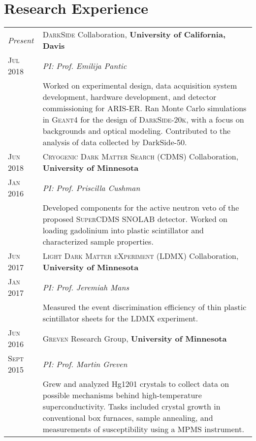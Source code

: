 \documentclass[a4paper,10pt]{article}
\newcommand{\UCD}{\textbf{University of California, Davis\xspace}}
\newcommand{\UMN}{\textbf{University of Minnesota\xspace}}
\begin{document}
\section{Research Experience}
\begin{tabular}{R{1.5cm}|L{14cm}}
\emph{Present}  & \textsc{DarkSide} Collaboration, \UCD \\
\textsc{Jul 2018} & \textit{PI: Prof. Emilija Pantic} \\
& {\footnotesize Worked on experimental design, data acquisition system development, hardware development, and detector commissioning for ARIS-ER. Ran Monte Carlo simulations in \textsc{Geant4} for the design of \textsc{DarkSide-20k}, with a focus on backgrounds and optical modeling. Contributed to the analysis of data collected by DarkSide-50.} \\

\hline \hline \hline {}

\textsc{Jun 2018} & \textsc{Cryogenic Dark Matter Search (CDMS)} Collaboration, \UMN \\
\textsc{Jan 2016} & \textit{PI: Prof. Priscilla Cushman} \\
& {\footnotesize Developed components for the active neutron veto of the proposed \textsc{SuperCDMS SNOLAB} detector. Worked on loading gadolinium into plastic scintillator and characterized sample properties.} \\

\hline \hline \hline {}

\textsc{Jun 2017}  & \textsc{Light Dark Matter eXperiment (LDMX)} Collaboration, \UMN \\
\textsc{Jan 2017} & \textit{PI: Prof. Jeremiah Mans} \\
& {\footnotesize Measured the event discrimination efficiency of thin plastic scintillator sheets for the \textsc{LDMX} experiment.} \\

\hline \hline \hline {}

\textsc{Jun 2016} & \textsc{Greven} Research Group, \UMN \\
\textsc{Sept 2015} & \textit{PI: Prof. Martin Greven} \\
& {\footnotesize Grew and analyzed Hg1201 crystals to collect data on possible mechanisms behind high-temperature superconductivity. Tasks included crystal growth in conventional box furnaces, sample annealing, and measurements of susceptibility using a MPMS instrument.} \\
 
\end{tabular}
\end{document}
